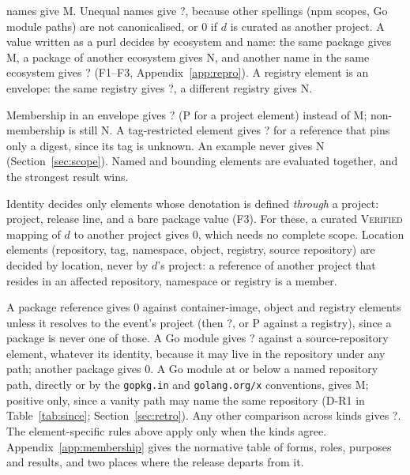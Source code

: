 \documentclass[11pt,a4paper]{article}
\newcommand{\code}[1]{\texttt{#1}}
\newcommand{\Mem}{\textsf{M}}
\newcommand{\Non}{\textsf{N}}
\newcommand{\Ind}{\textsf{?}}
\newcommand{\Proj}{\textsf{P}}
\newcommand{\NoA}{\textsf{0}}
\begin{document}
\begin{description}[leftmargin=*,font=\normalfont\itshape,nosep]
    names give \Mem{}. Unequal names give \Ind{}, because other
    spellings (npm scopes, Go module paths) are not canonicalised, or
    \NoA{} if $d$ is curated as another project. A value written as a
    purl decides by ecosystem and name: the same package gives \Mem{},
    a package of another ecosystem gives \Non{}, and another name in
    the same ecosystem gives \Ind{} (F1--F3,
    Appendix~\ref{app:repro}). A registry element is an envelope: the
    same registry gives \Ind{}, a different registry gives \Non{}.
  \item[Envelopes and examples.] Membership in an envelope gives \Ind{}
    (\Proj{} for a project element) instead of \Mem{}; non-membership
    is still \Non{}. A tag-restricted element gives \Ind{} for a
    reference that pins only a digest, since its tag is unknown. An
    example never gives \Non{} (Section~\ref{sec:scope}). Named and
    bounding elements are evaluated together, and the strongest result
    wins.
  \item[Identity versus location.] Identity decides only elements
    whose denotation is defined \emph{through} a project: project,
    release line, and a bare package value (F3). For these, a curated
    \textsc{Verified} mapping of $d$ to another project gives \NoA{},
    which needs no complete scope. Location elements (repository, tag,
    namespace, object, registry, source repository) are decided by
    location, never by $d$'s project: a reference of another project
    that resides in an affected repository, namespace or registry is a
    member.
  \item[Across reference kinds.] A package reference gives \NoA{}
    against container-image, object and registry elements unless it
    resolves to the event's project (then \Ind{}, or \Proj{} against a
    registry), since a package is never one of those. A Go module gives \Ind{} against a
    source-repository element, whatever its identity, because it may
    live in the repository under any path; another package gives \NoA{}.
    A Go module at or below a named repository path, directly or by the
    \code{gopkg.in} and \code{golang.org/x} conventions, gives \Mem{};
    positive only, since a vanity path may name the same repository
    (D-R1 in Table~\ref{tab:since}; Section~\ref{sec:retro}). Any other comparison across kinds
    gives \Ind{}. The element-specific rules above apply only when the
    kinds agree. Appendix~\ref{app:membership} gives the normative
    table of forms, roles, purposes and results, and two places where
    the release departs from it.
\end{description}
\end{document}
